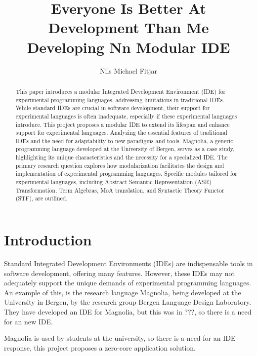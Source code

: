 \documentclass[runningheads]{llncs}
\title{Everyone Is Better At Development Than Me\\
\large{Developing Nn Modular IDE}
}
\author{Nils Michael Fitjar\inst{1}
}
\institute{University of Bergen
\email{nfi005@uib.no}
}
\begin{document}
\maketitle

\begin{abstract}
  This paper introduces a modular Integrated Development Environment (IDE) for
  experimental programming languages, addressing limitations in traditional
  IDEs. While standard IDEs are crucial in software development, their support
  for experimental languages is often inadequate, especially if these
  experimental languages introduce. This project proposes a modular IDE to
  extend its lifespan and enhance support for experimental languages. Analyzing
  the essential features of traditional IDEs and the need for adaptability to
  new paradigms and tools. Magnolia, a generic programming language developed at
  the University of Bergen, serves as a case study, highlighting its unique
  characteristics and the necessity for a specialized IDE.
  The primary research question explores how
  modularization facilitates the design and implementation of experimental
  programming languages. Specific modules tailored for experimental languages,
  including Abstract Semantic Representation (ASR) Transformation,
  Term Algebras, MoA translation, and Syntactic Theory Functor (STF), are
  outlined.
\end{abstract}

\section{Introduction}

Standard Integrated Development Environments (IDEs) are indispensable tools in
software development, offering many features. However, these IDEs may not
adequately support the unique demands of experimental programming languages. An
example of this, is the research language Magnolia, being developed at the University
in Bergen, by the research group Bergen Language Design Laboratory. They have
developed an IDE for Magnolia, but this was in ???, so there is a need for an
new IDE.

Magnolia is
used by students at the university, so there is a need for an IDE
response, this project proposes a zero-core application solution.
\end{document}
